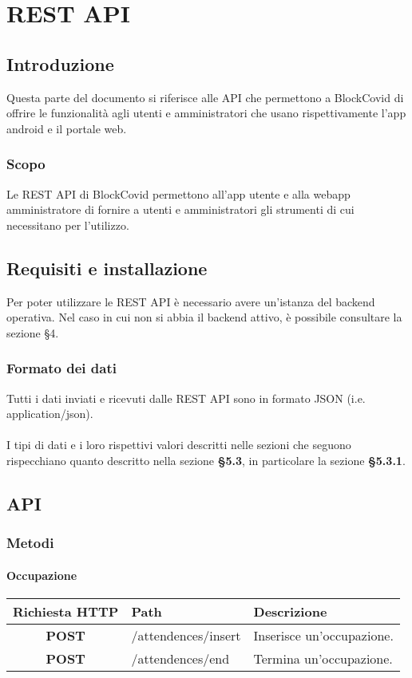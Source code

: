 \section{REST API}
\subsection{Introduzione}
Questa parte del documento si riferisce alle API che permettono a BlockCovid di offrire le funzionalità agli utenti e amministratori che usano rispettivamente l'app android e il portale web.

\subsubsection{Scopo}
Le REST API di BlockCovid permettono all'app utente e alla webapp amministratore di fornire a utenti e amministratori gli strumenti di cui necessitano per l'utilizzo.

\subsection{Requisiti e installazione}
Per poter utilizzare le REST API è necessario avere un'istanza del backend operativa. Nel caso in cui non si abbia il backend attivo, è possibile consultare la sezione §4.

\subsubsection{Formato dei dati}
Tutti i dati inviati e ricevuti dalle REST API sono in formato JSON (i.e. application/json).\\\\
I tipi di dati e i loro rispettivi valori descritti nelle sezioni che seguono rispecchiano quanto descritto nella sezione \textbf{§5.3}, in particolare la sezione \textbf{§5.3.1}.

\subsection{API}
\subsubsection{Metodi}
\paragraph{Occupazione}
\begin{center}
	\begin{longtable}{|c|p{7cm}|p{5cm}|}
		\hline
		\rowcolor{lighter-grayer}
		\textbf{Richiesta HTTP} & \textbf{Path} & \textbf{Descrizione}\\		
		\hline
		\endfirsthead
		\textbf{POST} & /attendences/insert & Inserisce un'occupazione.\\
		\hline
		\textbf{POST} & /attendences/end & Termina un'occupazione.\\
		\hline
	\end{longtable}
\end{center}
